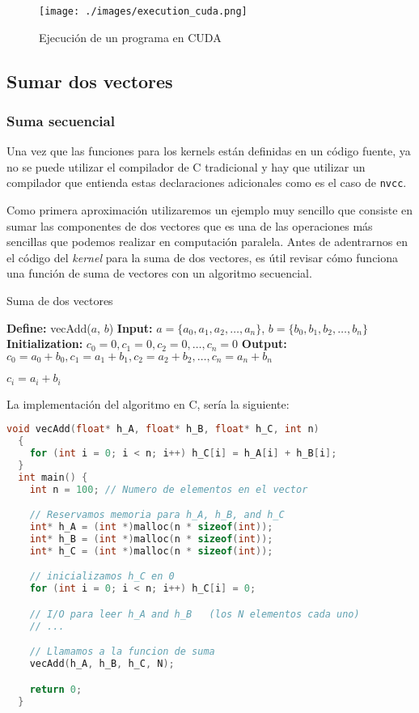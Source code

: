 \begin{figure}[H]
  \centering
  \texttt{[image: ./images/execution\_cuda.png]}
  \caption{Ejecución de un programa en CUDA}
  \label{fig:execution_cuda}
\end{figure}

\subsection{Sumar dos vectores}

\subsubsection{Suma secuencial}

Una vez que las funciones para los kernels están definidas en un código fuente, ya no se puede utilizar el compilador de
C tradicional y hay que utilizar un compilador que entienda estas declaraciones adicionales como es el caso de
\texttt{nvcc}.

Como primera aproximación utilizaremos un ejemplo muy sencillo que consiste en sumar las componentes de dos vectores que
es una de las operaciones más sencillas que podemos realizar en computación paralela. Antes de adentrarnos en el código
del \textit{kernel} para la suma de dos vectores, es útil revisar cómo funciona una función de suma de vectores con un
algoritmo secuencial.

\begin{algorithm}
\caption{Suma de dos vectores}
  \label{alg:vecAdd}
  \begin{algorithmic}[1]
  \Statex \textbf{Define:} vecAdd($a$, $b$)
  \Statex \textbf{Input:} $a = \{a_0, a_1, a_2, \ldots, a_n\}$, $b = \{b_0, b_1, b_2, \ldots, b_n\}$
  \Statex \textbf{Initialization:} $c_0 = 0, c_1 = 0, c_2 = 0, \ldots, c_n = 0$
  \Statex \textbf{Output:} $c_0 = a_0 + b_0, c_1 = a_1 + b_1, c_2 = a_2 + b_2, \ldots, c_n = a_n + b_n$

    \State $c_i = a_i + b_i$
  \EndFor
  \end{algorithmic}
\end{algorithm}

\newpage

La implementación del algoritmo en C, sería la siguiente:

\begin{lstlisting}[language=C]
  void vecAdd(float* h_A, float* h_B, float* h_C, int n)
  {
    for (int i = 0; i < n; i++) h_C[i] = h_A[i] + h_B[i];
  }
  int main() {
    int n = 100; // Numero de elementos en el vector

    // Reservamos memoria para h_A, h_B, and h_C
    int* h_A = (int *)malloc(n * sizeof(int));
    int* h_B = (int *)malloc(n * sizeof(int));
    int* h_C = (int *)malloc(n * sizeof(int));

    // inicializamos h_C en 0
    for (int i = 0; i < n; i++) h_C[i] = 0;

    // I/O para leer h_A and h_B   (los N elementos cada uno)
    // ...

    // Llamamos a la funcion de suma
    vecAdd(h_A, h_B, h_C, N);

    return 0;
  }
\end{lstlisting}

